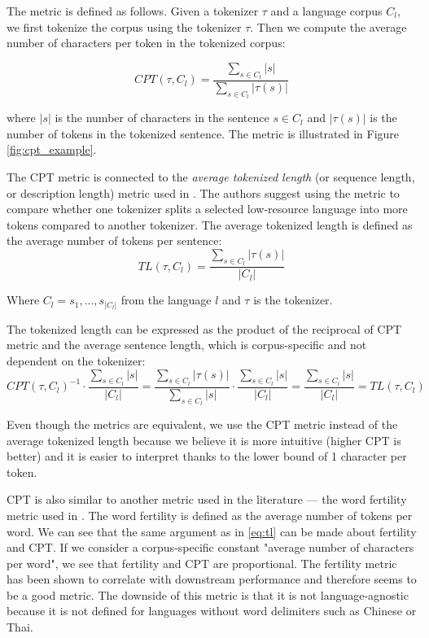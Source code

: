 The metric is defined as follows. Given a tokenizer $\tau$ and a language corpus $C_l$, we first tokenize the corpus using the tokenizer $\tau$. Then we compute the average number of characters per token in the tokenized corpus:

\begin{equation}
    CPT(\tau, C_l) = \frac{\sum_{s \in C_l}|s|}{\sum_{s \in C_l}|\tau(s)|}
\end{equation}

where $|s|$ is the number of characters in the sentence $s \in C_l$ and $|\tau(s)|$ is the number of tokens in the tokenized sentence. The metric is illustrated in Figure \ref{fig:cpt_example}.

The CPT metric is connected to the \textit{average tokenized length} (or sequence length, or description length) metric used in \citet{chung_improving_2020,liang_xlm-v_2023}. The authors suggest using the metric to compare whether one tokenizer splits a selected low-resource language into more tokens compared to another tokenizer. The average tokenized length is defined as the average number of tokens per sentence: 
\begin{equation}
\label{eq:tl_def}
    TL(\tau, C_l) = \frac{\sum_{s \in C_l}|\tau(s)|}{|C_l|}
\end{equation}

Where $C_l = {s_1, ..., s_{|C_l|}}$ from the language $l$ and $\tau$ is the tokenizer.

The tokenized length can be expressed as the product of the reciprocal of CPT metric and the average sentence length, which is corpus-specific and not dependent on the tokenizer:
\begin{equation}
\label{eq:tl}
    CPT(\tau, C_l)^{-1} \cdot \frac{\sum_{s \in C_l}|s|}{|C_l|} = \frac{\sum_{s \in C_l}|\tau(s)|}{\sum_{s \in C_l}|s|} \cdot \frac{\sum_{s \in C_l}|s|}{|C_l|} = \frac{\sum_{s \in C_l}|s|}{|C_l|} = TL(\tau, C_l)
\end{equation}

Even though the metrics are equivalent, we use the CPT metric instead of the average tokenized length because we believe it is more intuitive (higher CPT is better) and it is easier to interpret thanks to the lower bound of 1 character per token.

CPT is also similar to another metric used in the literature --- the word fertility metric used in \citet{rust_how_2021}. The word fertility is defined as the average number of tokens per word. We can see that the same argument as in \autoref{eq:tl} can be made about fertility and CPT. If we consider a corpus-specific constant "average number of characters per word", we see that fertility and CPT are proportional. The fertility metric has been shown to correlate with downstream performance and therefore seems to be a good metric. The downside of this metric is that it is not language-agnostic because it is not defined for languages without word delimiters such as Chinese or Thai.


